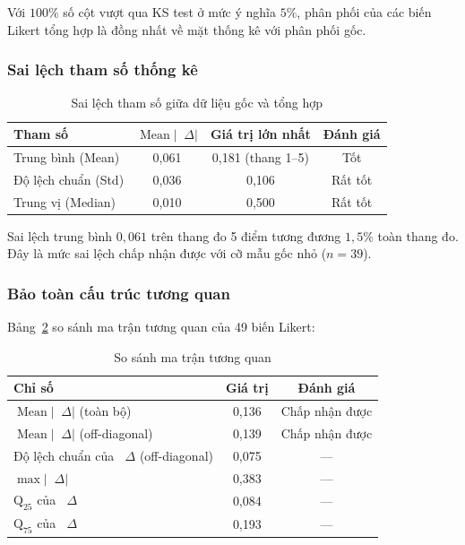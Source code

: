 \documentclass[12pt,a4paper]{article}
\newcommand{\diff}{\mathop{}\!\Delta}
\newcommand{\abs}[1]{\lvert #1 \rvert}
\begin{document}
Với $100\%$ số cột vượt qua KS test ở mức ý nghĩa $5\%$, 
phân phối của các biến Likert tổng hợp là đồng nhất về mặt thống kê 
với phân phối gốc. 

\subsubsection{Sai lệch tham số thống kê}

\begin{table}[H]
\centering
\caption{Sai lệch tham số giữa dữ liệu gốc và tổng hợp}
\label{tab:param}
\begin{tabular}{lccc}
\toprule
Tham số & $\operatorname{Mean}\abs{\diff}$ & Giá trị lớn nhất & Đánh giá \\
\midrule
Trung bình (Mean) & 0,061 & 0,181 (thang 1--5) & Tốt \\
Độ lệch chuẩn (Std) & 0,036 & 0,106 & Rất tốt \\
Trung vị (Median) & 0,010 & 0,500 & Rất tốt \\
\bottomrule
\end{tabular}
\end{table}

Sai lệch trung bình $0{,}061$ trên thang đo 5 điểm tương đương 
$1{,}5\%$ toàn thang đo. 
Đây là mức sai lệch chấp nhận được với cỡ mẫu gốc nhỏ ($n = 39$).

\subsubsection{Bảo toàn cấu trúc tương quan}

Bảng~\ref{tab:corr} so sánh ma trận tương quan của 49 biến Likert:

\begin{table}[H]
\centering
\caption{So sánh ma trận tương quan}
\label{tab:corr}
\begin{tabular}{lcc}
\toprule
Chỉ số & Giá trị & Đánh giá \\
\midrule
$\operatorname{Mean}\abs{\diff}$ (toàn bộ) & 0,136 & Chấp nhận được \\
$\operatorname{Mean}\abs{\diff}$ (off-diagonal) & 0,139 & Chấp nhận được \\
Độ lệch chuẩn của $\diff$ (off-diagonal) & 0,075 & --- \\
$\max\abs{\diff}$ & 0,383 & --- \\
$\mathrm{Q}_{25}$ của $\diff$ & 0,084 & --- \\
$\mathrm{Q}_{75}$ của $\diff$ & 0,193 & --- \\
\bottomrule
\end{tabular}
\end{table}
\end{document}
